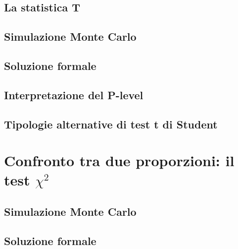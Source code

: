 \documentclass[a4paper,12pt,oneside]{book}
\begin{document}
\hypertarget{la-statistica-t}{%
\subsection{La statistica T}\label{la-statistica-t}}

\hypertarget{simulazione-monte-carlo}{%
\subsection{Simulazione Monte Carlo}\label{simulazione-monte-carlo}}

\hypertarget{soluzione-formale}{%
\subsection{Soluzione formale}\label{soluzione-formale}}

\hypertarget{interpretazione-del-p-level}{%
\subsection{Interpretazione del P-level}\label{interpretazione-del-p-level}}

\hypertarget{tipologie-alternative-di-test-t-di-student}{%
\subsection{Tipologie alternative di test t di Student}\label{tipologie-alternative-di-test-t-di-student}}

\hypertarget{confronto-tra-due-proporzioni-il-test-chi2}{%
\section{\texorpdfstring{Confronto tra due proporzioni: il test \(\chi^2\)}{Confronto tra due proporzioni: il test \textbackslash chi\^{}2}}\label{confronto-tra-due-proporzioni-il-test-chi2}}

\hypertarget{simulazione-monte-carlo-1}{%
\subsection{Simulazione Monte Carlo}\label{simulazione-monte-carlo-1}}

\hypertarget{soluzione-formale-1}{%
\subsection{Soluzione formale}\label{soluzione-formale-1}}
\end{document}
